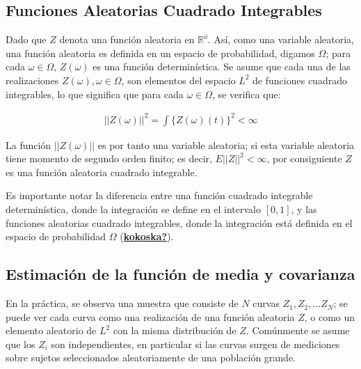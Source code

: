 \documentclass[
]{book}
\begin{document}
\hypertarget{funciones-aleatorias-cuadrado-integrables}{%
\subsection{\texorpdfstring{\textbf{Funciones Aleatorias Cuadrado Integrables}}{Funciones Aleatorias Cuadrado Integrables}}\label{funciones-aleatorias-cuadrado-integrables}}

Dado que \(Z\) denota una función aleatoria en \(\mathbb{R^d}\). Así, como una variable aleatoria, una función aleatoria es definida en un espacio de probabilidad, digamos \(\Omega\); para cada \(\omega \in \Omega\), \(Z(\omega)\) es una función determinística. Se asume que cada una de las realizaciones \(Z(\omega),\omega \in \Omega\), son elementos del espacio \(L^2\) de funciones cuadrado integrables, lo que significa que para cada \(\omega\in \Omega\), se verifica que:

\begin{align}
    ||Z(\omega)||^2=\int \{ Z(\omega)(t)\}^2<\infty
\end{align}

La función \(||Z(\omega)||\) es por tanto una variable aleatoria; si esta variable aleatoria tiene momento de segundo orden finito; es decir, \(E||Z||^2<\infty\), por consiguiente \(Z\) es una función aleatoria cuadrado integrable.

Es importante notar la diferencia entre una función cuadrado integrable determinística, donde la integración se define en el intervalo \([0,1]\), y las funciones aleatorias cuadrado integrables, donde la integración está definida en el espacio de probabilidad \(\Omega\) (\protect\hyperlink{ref-kokoska}{\textbf{kokoska?}}).

\hypertarget{estimaciuxf3n-de-la-funciuxf3n-de-media-y-covarianza}{%
\subsection{\texorpdfstring{\textbf{Estimación de la función de media y covarianza}}{Estimación de la función de media y covarianza}}\label{estimaciuxf3n-de-la-funciuxf3n-de-media-y-covarianza}}

En la práctica, se observa una muestra que consiste de \(N\) curvas \(Z_1,Z_2,...Z_N\); se puede ver cada curva como una realización de una función aleatoria \(Z\), o como un elemento aleatorio de \(L^2\) con la misma distribución de \(Z\). Comúnmente se asume que los \(Z_i\) son independientes, en particular si las curvas surgen de mediciones sobre sujetos seleccionados aleatoriamente de una población grande.
\end{document}

